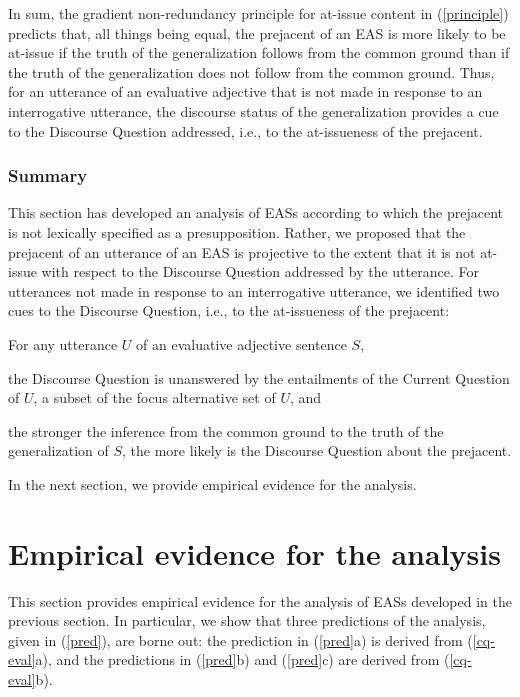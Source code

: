 \documentclass[11pt,fleqn]{article}
\newcommand{\6}{\mbox{$[\hspace*{-.6mm}[$}}
\newcommand{\9}{\mbox{$]\hspace*{-.6mm}]$}}
\begin{document}
In sum, the gradient non-redundancy principle for at-issue content in (\ref{principle}) predicts that, all things being equal, the prejacent of an EAS is more likely to be at-issue if the truth of the generalization follows from the common ground than if the truth of the generalization does not follow from the common ground. Thus, for an utterance of an evaluative adjective that is not made in response to an interrogative utterance, the discourse status of the generalization provides a cue to the Discourse Question addressed, i.e., to the at-issueness of the prejacent.

\subsubsection{Summary}

This section has developed an analysis of EASs according to which the prejacent is not lexically specified as a presupposition. Rather, we proposed that the prejacent of an utterance of an EAS is projective to the extent that it is not at-issue with respect to the Discourse Question addressed by the utterance. For utterances not made in response to an interrogative utterance, we identified two cues to the Discourse Question, i.e., to the at-issueness of the prejacent:

\begin{exe}
\ex\label{cq-eval} For any utterance $U$ of an evaluative adjective sentence $S$,

\begin{xlist}

\ex the Discourse Question is unanswered by the entailments of the Current Question of $U$, a subset of the focus alternative set of $U$, and

\ex the stronger the inference from the common ground to the truth of the generalization of $S$, the more likely is the Discourse Question about the prejacent.

\end{xlist}

\end{exe}
In the next section, we provide empirical evidence for the analysis.

\section{Empirical evidence for the analysis}\label{s4}



This section provides empirical evidence for the analysis of EASs developed in the previous section. In particular, we show that three predictions of the analysis, given in (\ref{pred}), are borne out: the prediction in (\ref{pred}a) is derived from (\ref{cq-eval}a), and the predictions in (\ref{pred}b) and (\ref{pred}c) are derived from (\ref{cq-eval}b).
\end{document}
